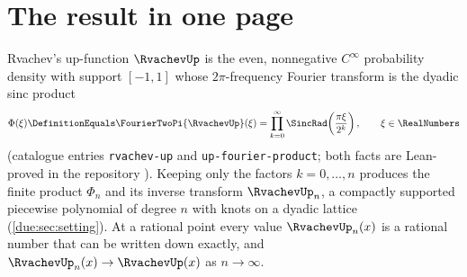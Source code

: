 \documentclass[11pt,oneside]{article}
\theoremstyle{plain}
\theoremstyle{definition}
\theoremstyle{remark}
\newcommand{\upn}[1]{\RvachevUp_{#1}}
\newcommand{\Phin}[1]{\Phi_{#1}}                            %
\newcommand{\PhiUp}{\Phi}                                   %
\newcommand{\dep}[1]{s\!\left(#1\right)}                    %
\newcommand{\Qq}{Q}                                         %
\begin{document}
\begin{abstract}
Geometric Lagrange interpolation at the nodes \(1,\Qq,\ldots,\Qq^{d}\),
\(\Qq=1/4\), turns the law into a single extraction row: for any
\(N\ge\dep{x}\),
\[
 \RvachevUp(x)=\frac{1}{\QPochhammer{\Qq}{\Qq}{d}}
 \sum_{j=0}^{d}(-1)^{d-j}\Qq^{\binom{d-j+1}{2}}
 \GaussianBinomial{d}{j}{\Qq}\,\upn{N+j}(x),
\]
recovering the exact value from \(d+1\) consecutive rational samples.  Every
mode coefficient, and hence every even derivative of \(\RvachevUp\) at \(x\),
is recovered by the same interpolation; the row's \(\ell^{\infty}\)
amplification is bounded by \((-\Qq;\Qq)_{\infty}/(\Qq;\Qq)_{\infty}
=1.96926\ldots\).  Against the corpus's Exponents volume, whose signed
quarter-base Richardson combination cancels these modes asymptotically for
general \(x\), the contribution here is exactness at dyadic points after the
depth.  Worked examples, an exact-arithmetic algorithm with its verification
specification, and a formalization register --- the row's algebra and the cell
identity at \(x=1/4\) are kernel-verified in Lean; the general theorem is not
--- complete the volume.
\end{abstract}

\tableofcontents
\clearpage


\section{The result in one page}
\label{due:sec:result}

Rvachev's up-function $\RvachevUp$ \cite{rvachev1990,arias1982} is the
even, nonnegative $C^\infty$ probability density with support $[-1,1]$
whose $2\pi$-frequency Fourier transform is the dyadic sinc product
\begin{equation}
 \PhiUp(\xi)\DefinitionEquals\FourierTwoPi{\RvachevUp}(\xi)
 =\prod_{k=0}^{\infty}\SincRad\!\left(\frac{\pi\xi}{2^{k}}\right),
 \qquad \xi\in\RealNumbers
 \label{due:eq:set-infinite-product}
\end{equation}
(catalogue entries \texttt{rvachev-up} and \texttt{up-fourier-product};
both facts are Lean-proved in the repository \cite{proveit-primary}).
Keeping only the factors $k=0,\ldots,n$ produces the finite product
$\Phin{n}$ and its inverse transform $\upn{n}$, a compactly supported
piecewise polynomial of degree $n$ with knots on a dyadic lattice
(\cref{due:sec:setting}).  At a rational point every value $\upn{n}(x)$ is
a rational number that can be written down exactly, and
$\upn{n}(x)\to\RvachevUp(x)$ as $n\to\infty$.
\end{document}
